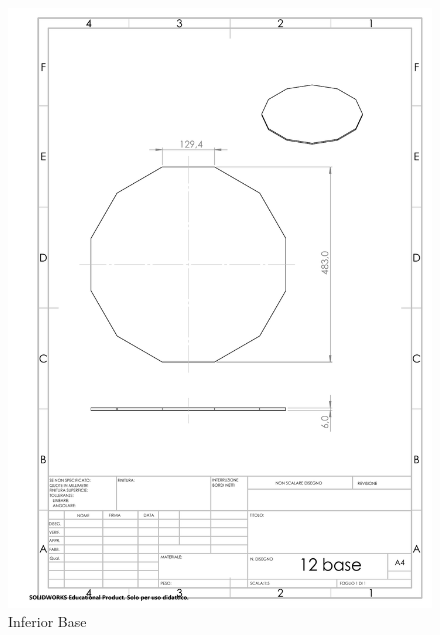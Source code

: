 \documentclass{article}
\begin{document}
\newpage
\begin{figure}[H]
    \centering
    \includegraphics[width=.9\linewidth]{technical_drawings/12_base.pdf}
    \caption{Inferior Base}
    \label{fig:12_base}
\end{figure}


\newpage
\end{document}
